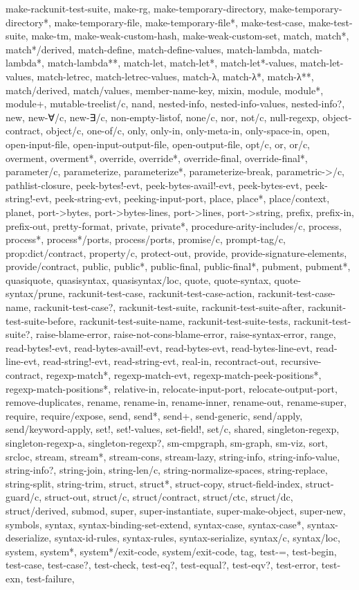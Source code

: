 {{make-rackunit-test-suite, make-rg, make-temporary-directory, make-temporary-directory*, make-temporary-file, make-temporary-file*, make-test-case, make-test-suite, make-tm, make-weak-custom-hash, make-weak-custom-set, match, match*, match*/derived, match-define, match-define-values, match-lambda, match-lambda*, match-lambda**, match-let, match-let*, match-let*-values, match-let-values, match-letrec, match-letrec-values, match-λ, match-λ*, match-λ**, match/derived, match/values, member-name-key, mixin, module, module*, module+, mutable-treelist/c, nand, nested-info, nested-info-values, nested-info?, new, new-∀/c, new-∃/c, non-empty-listof, none/c, nor, not/c, null-regexp, object-contract, object/c, one-of/c, only, only-in, only-meta-in, only-space-in, open, open-input-file, open-input-output-file, open-output-file, opt/c, or, or/c, overment, overment*, override, override*, override-final, override-final*, parameter/c, parameterize, parameterize*, parameterize-break, parametric->/c, pathlist-closure, peek-bytes!-evt, peek-bytes-avail!-evt, peek-bytes-evt, peek-string!-evt, peek-string-evt, peeking-input-port, place, place*, place/context, planet, port->bytes, port->bytes-lines, port->lines, port->string, prefix, prefix-in, prefix-out, pretty-format, private, private*, procedure-arity-includes/c, process, process*, process*/ports, process/ports, promise/c, prompt-tag/c, prop:dict/contract, property/c, protect-out, provide, provide-signature-elements, provide/contract, public, public*, public-final, public-final*, pubment, pubment*, quasiquote, quasisyntax, quasisyntax/loc, quote, quote-syntax, quote-syntax/prune, rackunit-test-case, rackunit-test-case-action, rackunit-test-case-name, rackunit-test-case?, rackunit-test-suite, rackunit-test-suite-after, rackunit-test-suite-before, rackunit-test-suite-name, rackunit-test-suite-tests, rackunit-test-suite?, raise-blame-error, raise-not-cons-blame-error, raise-syntax-error, range, read-bytes!-evt, read-bytes-avail!-evt, read-bytes-evt, read-bytes-line-evt, read-line-evt, read-string!-evt, read-string-evt, real-in, recontract-out, recursive-contract, regexp-match*, regexp-match-evt, regexp-match-peek-positions*, regexp-match-positions*, relative-in, relocate-input-port, relocate-output-port, remove-duplicates, rename, rename-in, rename-inner, rename-out, rename-super, require, require/expose, send, send*, send+, send-generic, send/apply, send/keyword-apply, set!, set!-values, set-field!, set/c, shared, singleton-regexp, singleton-regexp-a, singleton-regexp?, sm-cmpgraph, sm-graph, sm-viz, sort, srcloc, stream, stream*, stream-cons, stream-lazy, string-info, string-info-value, string-info?, string-join, string-len/c, string-normalize-spaces, string-replace, string-split, string-trim, struct, struct*, struct-copy, struct-field-index, struct-guard/c, struct-out, struct/c, struct/contract, struct/ctc, struct/dc, struct/derived, submod, super, super-instantiate, super-make-object, super-new, symbols, syntax, syntax-binding-set-extend, syntax-case, syntax-case*, syntax-deserialize, syntax-id-rules, syntax-rules, syntax-serialize, syntax/c, syntax/loc, system, system*, system*/exit-code, system/exit-code, tag, test-=, test-begin, test-case, test-case?, test-check, test-eq?, test-equal?, test-eqv?, test-error, test-exn, test-failure, }}
